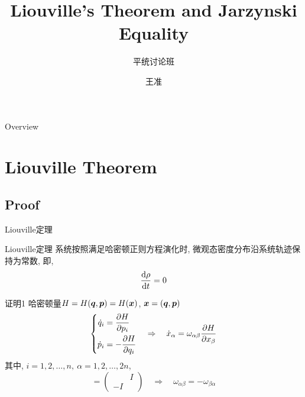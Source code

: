 \documentclass[aspectratio=169]{wzbeamer}
\title{Liouville's Theorem and Jarzynski Equality}
\subtitle{平统讨论班}
\author{王准}
\institute[pku]{北京大学}
\begin{document}
\maketitle 
    
\begin{frame}{Overview}
    \begin{multicols}{2}
		\tableofcontents
    \end{multicols}
\end{frame}


\section{Liouville Theorem}
    \subsection{Proof}
    \begin{frame}{Liouville定理}
        \begin{alertblock}{Liouville定理}
            系统按照满足哈密顿正则方程演化时, 微观态密度分布沿系统轨迹保持为常数, 即,
            \begin{equation}
                \dv{\rho}{t} = 0
            \end{equation}
        \end{alertblock}

    \end{frame}
    \begin{frame}{证明1}
        哈密顿量$H = H(\vb*q, \vb*p) = H(\vb*x)$, $\vb*x = (\vb*q, \vb*p)$
        \begin{equation}
            \left\{
            \begin{split}
                \dot{q}_i &= \pdv{H}{p_i}\\
                \dot{p}_i &= - \pdv{H}{q_i}
            \end{split}
            \right.\quad
            \Rightarrow\quad
            \dot{x}_\alpha = \omega_{\alpha\beta} \pdv{H}{x_\beta}
        \end{equation}
        其中, $i = 1,2,\dots,n, \ \alpha = 1,2,\dots,2n$, 
        \begin{equation}
            [\omega_{\alpha\beta}] = 
            \begin{pmatrix}
                & I \\
                -I & 
            \end{pmatrix}
            \quad\Rightarrow\quad
            \omega_{\alpha\beta} = -\omega_{\beta\alpha}
        \end{equation}
    \end{frame}
    
\end{document}
